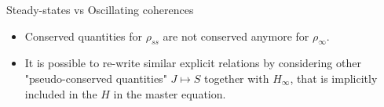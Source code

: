 \documentclass[10pt,xcolor={table,dvipsnames},t]{beamer}
\begin{document}
\begin{frame}{Steady-states vs Oscillating coherences}
  \begin{itemize}
    \item<1-> Conserved quantities for $\rho_{ss}$ are 
      not conserved anymore for $\rho_\infty$.
    \item<2-> It is possible to re-write similar explicit relations
      by considering other "pseudo-conserved quantities" $J\mapsto S$
      together with $H_\infty$, that is implicitly included in the 
      $H$ in the master equation.
  \end{itemize}
\end{frame}
\end{document}
